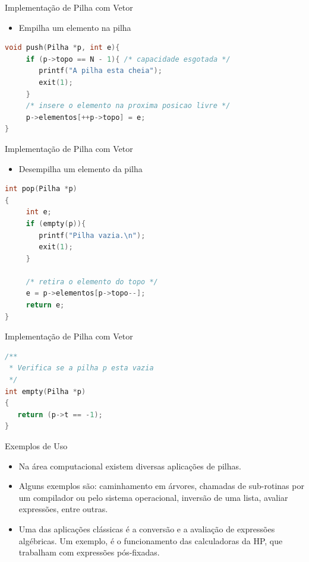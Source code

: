 \begin{frame}[fragile,c]{Implementação de Pilha com Vetor}
\begin{itemize}
	\item Empilha um elemento na pilha
\end{itemize}
\begin{lstlisting}[language=C]
void push(Pilha *p, int e){
     if (p->topo == N - 1){ /* capacidade esgotada */
        printf("A pilha esta cheia");
        exit(1);
     }
     /* insere o elemento na proxima posicao livre */
     p->elementos[++p->topo] = e;
}	
\end{lstlisting}  
\end{frame}

\begin{frame}[fragile,c]{Implementação de Pilha com Vetor}
\begin{itemize}
	\item Desempilha um elemento da pilha
\end{itemize}
\begin{lstlisting}[language=C]
int pop(Pilha *p)
{
     int e;
     if (empty(p)){
        printf("Pilha vazia.\n");
        exit(1);             
     } 
     
     /* retira o elemento do topo */
     e = p->elementos[p->topo--];
     return e;
}	
\end{lstlisting}  
\end{frame}


\begin{frame}[fragile]{Implementação de Pilha com Vetor}
\begin{lstlisting}[language=C]
/**
 * Verifica se a pilha p esta vazia
 */
int empty(Pilha *p)
{
   return (p->t == -1);
}

\end{lstlisting}
\end{frame}

\begin{frame}{Exemplos de Uso}
\begin{itemize}
	\item Na área computacional existem diversas aplicações de pilhas. 
	\item Alguns exemplos são: caminhamento em árvores, chamadas de sub-rotinas por um compilador ou pelo sistema operacional, inversão de uma lista, avaliar expressões, entre outras.
	\item Uma das aplicações clássicas é a conversão e a avaliação de expressões algébricas. Um exemplo, é o funcionamento das calculadoras da HP, que trabalham com expressões pós-fixadas.
\end{itemize}
\end{frame}






